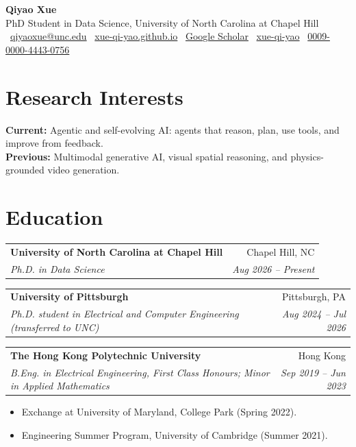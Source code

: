 \documentclass[11pt,letterpaper]{article}
\makeatletter
\newcommand{\entry}[4]{%
  \begin{tabularx}{\linewidth}{@{}X r@{}}
    \textbf{#1} & #2 \\
    \textit{#3} & \textit{#4} \\
  \end{tabularx}\vspace{0.15em}}
\makeatother
\begin{document}
\begin{center}
  {\Huge\bfseries\color{accent} Qiyao Xue}\\[0.35em]
  PhD Student in Data Science, University of North Carolina at Chapel Hill\\[0.3em]
  \small
  \faEnvelope\ \href{mailto:qiyaoxue@unc.edu}{qiyaoxue@unc.edu} \quad
  \faGlobe\ \href{https://xue-qi-yao.github.io}{xue-qi-yao.github.io} \quad
  \faGraduationCap\ \href{https://scholar.google.com/citations?user=yNPzzOAAAAAJ}{Google Scholar} \quad
  \faGithub\ \href{https://github.com/xue-qi-yao}{xue-qi-yao} \quad
  \faOrcid\ \href{https://orcid.org/0009-0000-4443-0756}{0009-0000-4443-0756}
\end{center}

\section{Research Interests}
\textbf{Current:} Agentic and self-evolving AI: agents that reason, plan, use tools, and improve from feedback.\\
\textbf{Previous:} Multimodal generative AI, visual spatial reasoning, and physics-grounded video generation.

\section{Education}
\entry{University of North Carolina at Chapel Hill}{Chapel Hill, NC}
      {Ph.D. in Data Science}{Aug 2026 -- Present}
\entry{University of Pittsburgh}{Pittsburgh, PA}
      {Ph.D. student in Electrical and Computer Engineering (transferred to UNC)}{Aug 2024 -- Jul 2026}
\entry{The Hong Kong Polytechnic University}{Hong Kong}
      {B.Eng. in Electrical Engineering, First Class Honours; Minor in Applied Mathematics}{Sep 2019 -- Jun 2023}
\vspace{-0.4em}
\begin{itemize}
  \item Exchange at University of Maryland, College Park (Spring 2022).
  \item Engineering Summer Program, University of Cambridge (Summer 2021).
\end{itemize}

\end{document}
